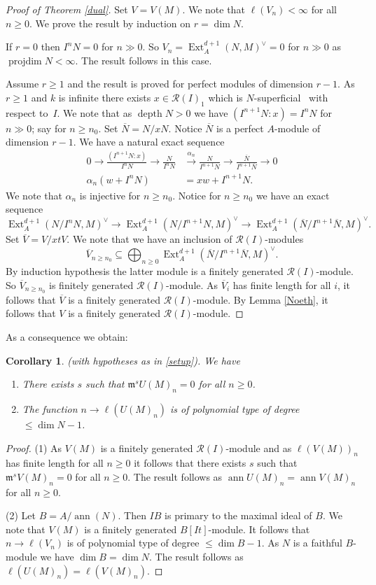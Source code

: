 \documentclass{amsart}
\newcommand{\wrt}{with respect to}
\newcommand{\m}{\mathfrak{m} }
\newcommand{\R}{\mathcal{R} }
\newcommand{\rt}{\rightarrow}
\newcommand{\ov}{\overline}
\newcommand{\projdim}{\operatorname{projdim}}
\newcommand{\depth}{\operatorname{depth}}
\newcommand{\ann}{\operatorname{ann}}
\newcommand{\Ext}{\operatorname{Ext}}
\theoremstyle{plain}
\newtheorem{corollary}[theorem]{Corollary}
\theoremstyle{definition}
\theoremstyle{remark}
\begin{document}
\begin{proof}[Proof of Theorem \ref{dual}] Set $V = V(M)$.
We note that $\ell(V_n) < \infty$ for all $n \geq 0$. We prove the result by induction on $r = \dim N$.

 If $r = 0$ then $I^n N = 0$ for $n \gg 0$. So $V_n = \Ext^{d+1}_A(N, M)^\vee = 0$ for $n \gg 0$ as $\projdim N < \infty$. The result follows in this case.

Assume $r \geq 1$ and the result is proved for perfect modules of dimension $r -1$. As $r \geq 1$ and $k$ is infinite there exists $x \in \R(I)_1$ which is $N$-superficial \ \wrt \ $I$. We note that as $\depth N > 0$ we have $(I^{n+1}N \colon x) = I^nN$ for $n \gg 0$; say for $n \geq n_0$.  Set $\ov{N} = N/xN$. Notice $\ov{N}$ is a perfect $A$-module of dimension $r - 1$. We have a natural exact sequence
\begin{align*}
  0 \rt \frac{(I^{n+1}N \colon x)}{I^n N} \rt \frac{N}{I^nN} &\xrightarrow{\alpha_n}  \frac{N}{I^{n+1}N} \rt  \frac{\ov{N}}{I^{n+1}\ov{N}} \rt 0\\
  \alpha_n(w + I^nN) &= xw + I^{n+1}N.
\end{align*}
We note that $\alpha_n$ is injective for $n \geq n_0$. Notice for $n \geq n_0$ we have an exact sequence
\[
\Ext^{d+1}_A(N/I^n N, M)^\vee \rt \Ext^{d+1}_A(N/I^{n+1} N, M)^\vee \rt \Ext^{d+1}_A(\ov{N}/I^{n+1} \ov{N}, M)^\vee.
\]
 Set $\ov{V} = V/xtV$. We note that we have an inclusion of $\R(I)$-modules
 \[
 \ov{V}_{n \geq n_0} \subseteq \bigoplus_{n\geq 0} \Ext^{d+1}_A(\ov{N}/I^{n+1} \ov{N}, M)^\vee.
 \]
 By induction hypothesis the latter module is a  finitely generated $\R(I)$-module. So $\ov{V}_{n \geq n_0}$ is finitely generated $\R(I)$-module. As $\ov{V}_i$ has finite length for all $i$, it follows that $\ov{V}$ is a finitely generated $\R(I)$-module. By Lemma \ref{Noeth}, it follows that $V$ is a finitely generated $\R(I)$-module.
\end{proof}
As a consequence we obtain:
\begin{corollary}\label{ann-e}(with  hypotheses as in \ref{setup}). We have
\begin{enumerate}[\rm (1)]
  \item There exists $s$ such that $\m^s U(M)_n = 0$ for all $n \geq 0$.
  \item The function $n \rt \ell(U(M)_n)$ is of polynomial type of degree $\leq \dim N - 1$.
\end{enumerate}
\end{corollary}
\begin{proof}
  (1) As $V(M)$ is a finitely generated $\R(I)$-module and as $\ell(V(M))_n$ has finite length for all $n \geq 0$ it follows that there exists $s$  such that $\m^s V(M)_n = 0$ for all $n \geq 0$.
  The result follows as $\ann U(M)_n = \ann V(M)_n$ for all $n \geq 0$.

  (2) Let $B = A/\ann(N)$. Then $IB$ is primary to the maximal ideal of $B$. We note that $V(M)$ is a finitely generated $B[It]$-module. It follows that $n \rt \ell(V_n)$ is of polynomial type of degree $\leq \dim B - 1$. As $N$ is a faithful $B$-module we have $\dim B = \dim N$. The result follows as $\ell(U(M)_n) = \ell(V(M)_n)$.
\end{proof}
\end{document}
